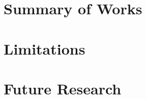\label{sec:Conclusion}

\section{Summary of Works}

\section{Limitations}\label{sec:Limitations}

\section{Future Research}
